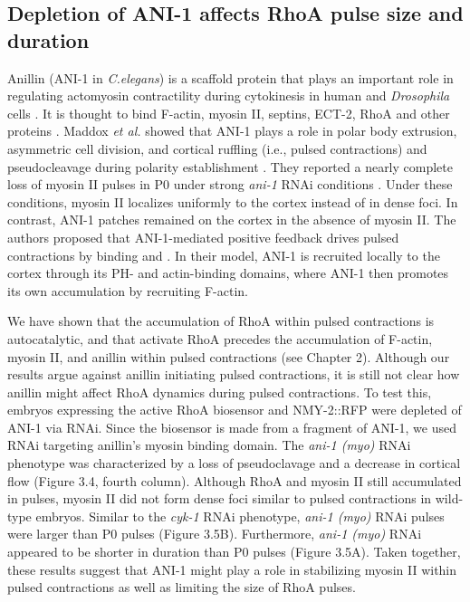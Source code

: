 \documentclass{ucetd}
\begin{document}
\subsection{Depletion of ANI-1 affects RhoA pulse size and duration}
Anillin (ANI-1 in \textit{C.elegans}) is a scaffold protein that plays an important role in regulating actomyosin contractility during cytokinesis in human and \textit{Drosophila} cells \cite{Piekny:2010es}.  It is thought to bind F-actin, myosin II, septins, ECT-2, RhoA and other proteins \cite{Piekny:2010es}.  Maddox \textit{et al.} showed that ANI-1 plays a role in polar body extrusion, asymmetric cell division, and cortical ruffling (i.e., pulsed contractions) and pseudocleavage during polarity establishment \cite{Maddox:2005gd}.  They reported a nearly complete loss of myosin II pulses in P0 under strong \textit{ani-1} RNAi conditions \cite{Maddox:2005gd}.  Under these conditions, myosin II localizes uniformly to the cortex instead of in dense foci.  In contrast, ANI-1 patches remained on the cortex in the absence of myosin II.  The authors proposed that ANI-1-mediated positive feedback drives pulsed contractions by binding and \cite{Maddox:2005gd}.  In their model, ANI-1 is recruited locally to the cortex through its PH- and actin-binding domains, where ANI-1 then promotes its own accumulation by recruiting F-actin.

We have shown that the accumulation of RhoA within pulsed contractions is autocatalytic, and that activate RhoA precedes the accumulation of F-actin, myosin II, and anillin within pulsed contractions (see Chapter 2).  Although our results argue against anillin initiating pulsed contractions, it is still not clear how anillin might affect RhoA dynamics during pulsed contractions.  To test this, embryos expressing the active RhoA biosensor and NMY-2::RFP were depleted of ANI-1 via RNAi.  Since the biosensor is made from a fragment of ANI-1, we used RNAi targeting anillin's myosin binding domain.  The \textit{ani-1 (myo)} RNAi phenotype was characterized by a loss of pseudoclavage and a decrease in cortical flow (Figure 3.4, fourth column).  Although RhoA and myosin II still accumulated in pulses, myosin II did not form dense foci similar to pulsed contractions in wild-type embryos.  Similar to the \textit{cyk-1} RNAi phenotype, \textit{ani-1 (myo)} RNAi pulses were larger than P0 pulses (Figure 3.5B).  Furthermore, \textit{ani-1 (myo)} RNAi appeared to be shorter in duration than P0 pulses (Figure 3.5A).  Taken together, these results suggest that ANI-1 might play a role in stabilizing myosin II within pulsed contractions as well as limiting the size of RhoA pulses.
\end{document}
